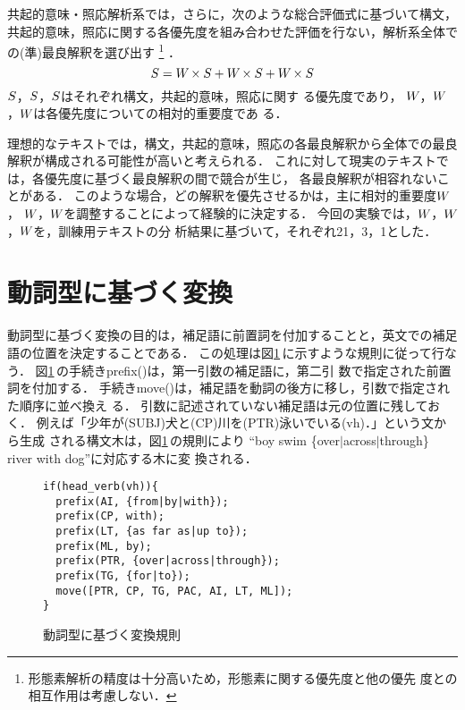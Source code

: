 共起的意味・照応解析系では，さらに，次のような総合評価式に基づいて構文，
共起的意味，照応に関する各優先度を組み合わせた評価を行ない，解析系全体で
の(準)最良解釈を選び出す
\footnote{形態素解析の精度は十分高いため，形態素に関する優先度と他の優先
度との相互作用は考慮しない．}
．
\begin{equation}
S = W_{} \times S_{} + W_{} \times S_{} + W_{}
\times S_{}
\label{eq:balance}
\end{equation}
$S_{}$，$S_{}$，$S_{}$はそれぞれ構文，共起的意味，照応に関す
る優先度であり，
$W_{}$，$W_{}$，$W_{}$は各優先度についての相対的重要度であ
る．

理想的なテキストでは，構文，共起的意味，照応の各最良解釈から全体での最良
解釈が構成される可能性が高いと考えられる．
これに対して現実のテキストでは，各優先度に基づく最良解釈の間で競合が生じ，
各最良解釈が相容れないことがある．
このような場合，どの解釈を優先させるかは，主に相対的重要度$W_{}$，
$W_{}$，$W_{}$を調整することによって経験的に決定する．
今回の実験では，$W_{}$，$W_{}$，$W_{}$を，訓練用テキストの分
析結果に基づいて，それぞれ21，3，1とした．

\section{動詞型に基づく変換}
\label{sec:transfer:sentpat}

動詞型に基づく変換の目的は，補足語に前置詞を付加することと，英文での補足
語の位置を決定することである．
この処理は図\ref{fig:spt_rule_ex}\,に示すような規則に従って行なう．
図\ref{fig:spt_rule_ex}\,の手続きprefix()は，第一引数の補足語に，第二引
数で指定された前置詞を付加する．
手続きmove()は，補足語を動詞の後方に移し，引数で指定された順序に並べ換え
る．
引数に記述されていない補足語は元の位置に残しておく．
例えば「少年が(SUBJ)犬と(CP)川を(PTR)泳いでいる(vh)．」という文から生成
される構文木は，図\ref{fig:spt_rule_ex}\,の規則により
``boy swim \{over$|$across$|$through\} river with dog''に対応する木に変
換される．
\begin{figure}[tbhp]
\begin{RULE}{0.5\textwidth}
\begin{verbatim}
if(head_verb(vh)){
  prefix(AI, {from|by|with});
  prefix(CP, with);
  prefix(LT, {as far as|up to});
  prefix(ML, by);
  prefix(PTR, {over|across|through});
  prefix(TG, {for|to});
  move([PTR, CP, TG, PAC, AI, LT, ML]);
}
\end{verbatim}
\end{RULE}
\caption{動詞型に基づく変換規則}
\label{fig:spt_rule_ex}
\end{figure}

